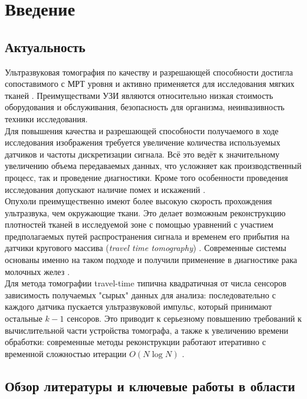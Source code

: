 \documentclass[14pt]{matmex-diploma}
\begin{document}
\section{Введение}

\subsection{Актуальность}
Ультразвуковая томография по качеству и разрешающей способности достигла сопоставимого с МРТ уровня и активно применяется для исследования мягких тканей \cite{hopp2014breast}. 
Преимуществами УЗИ являются относительно низкая стоимость оборудования и обслуживания, безопасность для организма, неинвазивность техники исследования. \\
Для повышения качества и разрешающей способности получаемого в ходе исследования изображения требуется увеличение количества используемых датчиков и частоты дискретизации сигнала. Всё это ведёт к значительному увеличению объема передаваемых данных, что усложняет как производственный процесс, так и проведение диагностики. Кроме того особенности проведения исследования допускают наличие помех и искажений \cite{shannon_th}. \\
Опухоли преимущественно имеют более высокую скорость прохождения ультразвука, чем окружающие ткани. Это делает возможным реконструкцию плотностей тканей в исследуемой зоне с помощью уравнений с участием предполагаемых путей распространения сигнала и временем его прибытия на датчики кругового массива (\textit{travel time tomography}) \cite{quan2007sound}. Современные системы основаны именно на таком подходе и получили применение в диагностике рака молочных желез \cite{hormati2010robust}\cite{schreiman1984ultrasound}. \\
Для метода томографии travel-time типична квадратичная от числа сенсоров зависимость получаемых "сырых" данных для анализа: последовательно с каждого датчика пускается ультразвуковой импульс, который принимают остальные $k-1$ сенсоров. Это приводит к серьезному повышению требований к вычислительной части устройства томографа, а также к увеличению времени обработки: современные методы реконструкции работают итеративно с временной сложностью итерации $O(N\log N)$ \cite{chen2012compressive}.


\subsection{Обзор литературы и ключевые работы в области}
\end{document}
